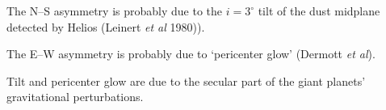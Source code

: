 \documentclass[20pt,35mmSlide,landscape]{foils}
\begin{document}
\newpage
\pagecolor{light-yellow}
\small

\vspace*{-1.5in}\parbox{10in}{
\parbox[c]{4.75in}{
\vspace*{-0.1in}\begin{figure}[t]
\end{figure}
The N--S asymmetry is probably due to the $i=3^\circ$ tilt
of the dust midplane detected by Helios (Leinert {\it et al} 1980)).
}
\hfil\parbox{4.75in}{
\vspace*{-1in}\begin{figure}[t]
\vspace*{-0.0in}
\end{figure}
The E--W asymmetry is probably due to `pericenter glow' (Dermott {\it et al}).
}
}

\parbox{10in}{Tilt and pericenter glow are due to the secular part
of the giant planets' gravitational perturbations.}
\end{document}
